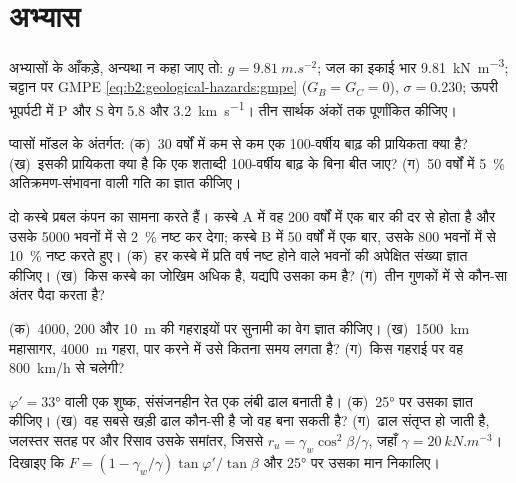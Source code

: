 \section*{अभ्यास}\label{sec:b2:geological-hazards:exercises}

अभ्यासों के आँकड़े, अन्यथा न कहा जाए तो: $g = \qty{9.81}{m.s^{-2}}$; जल का इकाई भार
\qty{9.81}{kN.m^{-3}}; चट्टान पर GMPE \eqref{eq:b2:geological-hazards:gmpe} ($G_B = G_C = 0$),
$\sigma = 0.230$; ऊपरी भूपर्पटी में P और S वेग 5.8 और \qty{3.2}{km.s^{-1}}। तीन
सार्थक अंकों तक पूर्णांकित कीजिए।

\begin{exercise}[$\star$]\label{exo:b2:geological-hazards:1}
प्वासों मॉडल के अंतर्गत: (क)~30 वर्षों में कम से कम एक 100-वर्षीय बाढ़ की प्रायिकता क्या है?
(ख)~इसकी प्रायिकता क्या है कि एक शताब्दी 100-वर्षीय बाढ़ के बिना बीत जाए? (ग)~50 वर्षों में
\qty{5}{\percent} अतिक्रमण-संभावना वाली गति का  ज्ञात कीजिए।
\end{exercise}

\begin{exercise}[$\star$]\label{exo:b2:geological-hazards:2}
दो कस्बे प्रबल कंपन का सामना करते हैं। कस्बे A में वह 200 वर्षों में एक बार की दर से होता है और
उसके 5000 भवनों में से \qty{2}{\percent} नष्ट कर देगा; कस्बे B में 50 वर्षों में एक बार, उसके 800 भवनों में से
\qty{10}{\percent} नष्ट करते हुए। (क)~हर कस्बे में प्रति वर्ष नष्ट होने वाले भवनों की अपेक्षित संख्या
ज्ञात कीजिए। (ख)~किस कस्बे का जोखिम अधिक है, यद्यपि उसका  कम है? (ग)~तीन
गुणकों में से कौन-सा अंतर पैदा करता है?
\end{exercise}

\begin{exercise}[$\star$]\label{exo:b2:geological-hazards:3}
(क)~4000, 200 और \qty{10}{m} की गहराइयों पर सुनामी का वेग ज्ञात कीजिए। (ख)~\qty{1500}{km}
महासागर, \qty{4000}{m} गहरा, पार करने में उसे कितना समय लगता है? (ग)~किस गहराई पर वह
\qty{800}{km/h} से चलेगी?
\end{exercise}

\begin{exercise}[$\star$]\label{exo:b2:geological-hazards:4}
$\varphi' = \ang{33}$ वाली एक शुष्क, संसंजनहीन रेत एक लंबी ढाल बनाती है। (क)~\ang{25} पर उसका  ज्ञात कीजिए। (ख)~वह सबसे खड़ी ढाल कौन-सी है जो वह बना सकती है? (ग)~ढाल संतृप्त हो जाती है,
जलस्तर सतह पर और रिसाव उसके समांतर, जिससे $r_u = \gamma_w\cos^2\beta/\gamma$,
जहाँ $\gamma = \qty{20}{kN.m^{-3}}$। दिखाइए कि $F = (1 - \gamma_w/\gamma)\tan\varphi'/\tan\beta$ और
\ang{25} पर उसका मान निकालिए।
\end{exercise}

